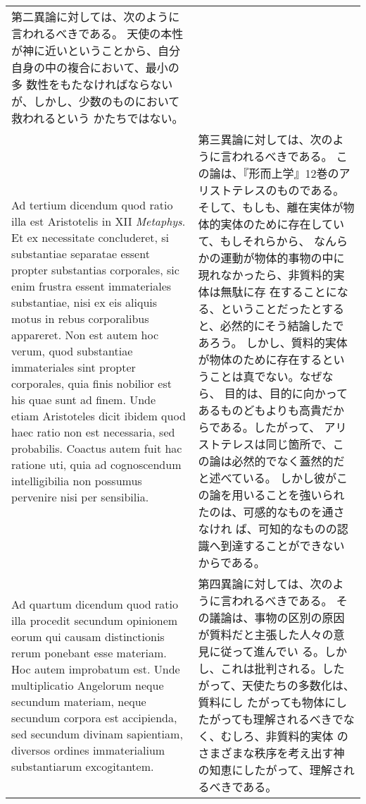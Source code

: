 \documentclass[10pt]{jsarticle} %
\begin{document}
\begin{longtable}{p{21em}p{21em}}
第二異論に対しては、次のように言われるべきである。
天使の本性が神に近いということから、自分自身の中の複合において、最小の多
 数性をもたなければならないが、しかし、少数のものにおいて救われるという
 かたちではない。

\\


Ad tertium dicendum quod ratio illa est
Aristotelis in XII {\itshape Metaphys}. Et ex necessitate concluderet, si
substantiae separatae essent propter substantias corporales, sic enim
frustra essent immateriales substantiae, nisi ex eis aliquis motus in
rebus corporalibus appareret. Non est autem hoc verum, quod substantiae
immateriales sint propter corporales, quia finis nobilior est his quae
sunt ad finem. Unde etiam Aristoteles dicit ibidem quod haec ratio non
est necessaria, sed probabilis. Coactus autem fuit hac ratione uti, quia
ad cognoscendum intelligibilia non possumus pervenire nisi per
sensibilia.


&

第三異論に対しては、次のように言われるべきである。
この論は、『形而上学』12巻のアリストテレスのものである。
そして、もしも、離在実体が物体的実体のために存在していて、もしそれらから、
 なんらかの運動が物体的事物の中に現れなかったら、非質料的実体は無駄に存
 在することになる、ということだったとすると、必然的にそう結論したであろう。
しかし、質料的実体が物体のために存在するということは真でない。なぜなら、
 目的は、目的に向かってあるものどもよりも高貴だからである。したがって、
 アリストテレスは同じ箇所で、この論は必然的でなく蓋然的だと述べている。
 しかし彼がこの論を用いることを強いられたのは、可感的なものを通さなけれ
 ば、可知的なものの認識へ到達することができないからである。


\\


Ad quartum dicendum quod ratio illa procedit
secundum opinionem eorum qui causam distinctionis rerum ponebant esse
materiam. Hoc autem improbatum est. Unde multiplicatio Angelorum neque
secundum materiam, neque secundum corpora est accipienda, sed secundum
divinam sapientiam, diversos ordines immaterialium substantiarum
excogitantem.


&

第四異論に対しては、次のように言われるべきである。
その議論は、事物の区別の原因が質料だと主張した人々の意見に従って進んでい
 る。しかし、これは批判される。したがって、天使たちの多数化は、質料にし
 たがっても物体にしたがっても理解されるべきでなく、むしろ、非質料的実体
 のさまざまな秩序を考え出す神の知恵にしたがって、理解されるべきである。


\end{longtable}
\end{document}
